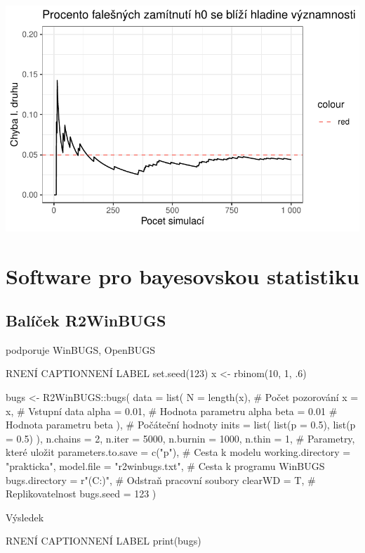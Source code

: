 \documentclass[
  11pt,
  a4paper]{report}
\begin{document}
\includegraphics{index_files/figure-pdf/unnamed-chunk-4-1.pdf}

\section{Software pro bayesovskou
statistiku}\label{software-pro-bayesovskou-statistiku}

\subsection{Balíček R2WinBUGS}\label{baluxedux10dek-r2winbugs}

podporuje WinBUGS, OpenBUGS

\begin{code}{R}{NENÍ CAPTION}{NENÍ LABEL}
set.seed(123)
x <- rbinom(10, 1, .6)

bugs <- R2WinBUGS::bugs(
    data = list(
        N     = length(x), # Počet pozorování
        x     = x,         # Vstupní data
        alpha = 0.01,      # Hodnota parametru alpha
        beta  = 0.01       # Hodnota parametru beta
    ),
    # Počáteční hodnoty
    inits = list(
        list(p = 0.5),
        list(p = 0.5)
    ),
    n.chains = 2, n.iter = 5000, n.burnin = 1000, n.thin = 1,
    # Parametry, které uložit
    parameters.to.save = c("p"),
    # Cesta k modelu
    working.directory = "prakticka",
    model.file = "r2winbugs.txt",
    # Cesta k programu WinBUGS
    bugs.directory = r"(C:\Users\Mike\Downloads{})",
    # Odstraň pracovní soubory
    clearWD = T,
    # Replikovatelnost
    bugs.seed = 123
)
\end{code}

Výsledek

\begin{code}{R}{NENÍ CAPTION}{NENÍ LABEL}
print(bugs)
\end{code}
\end{document}
